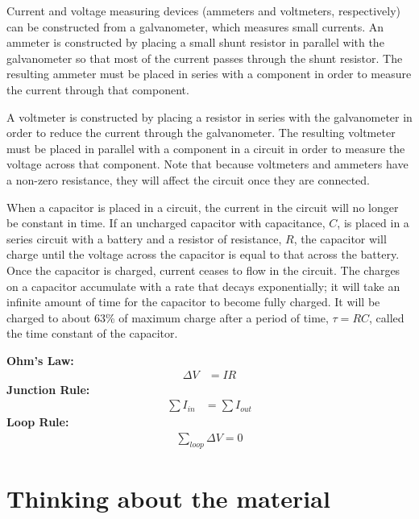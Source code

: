 \begin{chapterSummary}
Current and voltage measuring devices (ammeters and voltmeters, respectively) can be constructed from a galvanometer, which measures small currents. An ammeter is constructed by placing a small shunt resistor in parallel with the galvanometer so that most of the current passes through the shunt resistor. The resulting ammeter must be placed in series with a component in order to measure the current through that component.

A voltmeter is constructed by placing a resistor in series with the galvanometer in order to reduce the current through the galvanometer. The resulting voltmeter must be placed in parallel with a component in a circuit in order to measure the voltage across that component. Note that because voltmeters and ammeters have a non-zero resistance, they will affect the circuit once they are connected.

When a capacitor is placed in a circuit, the current in the circuit will no longer be constant in time. If an uncharged capacitor with capacitance, $C$, is placed in a series circuit with a battery and a resistor of resistance, $R$, the capacitor will charge until the voltage across the capacitor is equal to that across the battery. Once the capacitor is charged, current ceases to flow in the circuit. The charges on a capacitor accumulate with a rate that decays exponentially; it will take an infinite amount of time for the capacitor to become fully charged. It will be charged to about 63\% of maximum charge after a period of time, $\tau=RC$, called the time constant of the capacitor.

\end{chapterSummary}

\newpage
\begin{importantEquations}
\textbf{Ohm's Law:}
\begin{align*}
\Delta V &= IR
\end{align*}
\textbf{Junction Rule:}
\begin{align*}
\sum I_{in} &= \sum I_{out}
\end{align*}
\textbf{Loop Rule:}
\begin{align*}
\sum_{loop} \Delta V = 0
\end{align*}
\end{importantEquations}

\newpage
\section{Thinking about the material}

